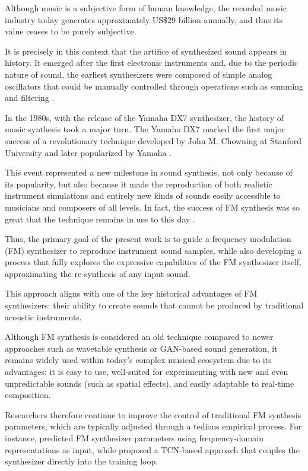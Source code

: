 \documentclass[10pt,conference]{IEEEtran}
\begin{document}
Although music is a subjective form of human knowledge, the recorded music industry today generates approximately US\$29 billion \cite{ifpi2025} annually, and thus its value ceases to be purely subjective.

It is precisely in this context that the artifice of synthesized sound appears in history. It emerged after the first electronic instruments and, due to the periodic nature of sound, the earliest synthesizers were composed of simple analog oscillators that could be manually controlled through operations such as summing and filtering \cite{holmes2016electronic}.

In the 1980s, with the release of the Yamaha DX7 synthesizer, the history of music synthesis took a major turn. The Yamaha DX7 marked the first major success of a revolutionary technique developed by John M. Chowning at Stanford University and later popularized by Yamaha \cite{claesson2021resynthesis}.

This event represented a new milestone in sound synthesis, not only because of its popularity, but also because it made the reproduction of both realistic instrument simulations and entirely new kinds of sounds easily accessible to musicians and composers of all levels. In fact, the success of FM synthesis was so great that the technique remains in use to this day \cite{holmes2016electronic}.

Thus, the primary goal of the present work is to guide a frequency modulation (FM) synthesizer to reproduce instrument sound samples, while also developing a process that fully explores the expressive capabilities of the FM synthesizer itself, approximating the re-synthesis of any input sound.

This approach aligns with one of the key historical advantages of FM synthesizers: their ability to create sounds that cannot be produced by traditional acoustic instruments.

Although FM synthesis is considered an old technique compared to newer approaches such as wavetable synthesis or GAN-based sound generation, it remains widely used within today’s complex musical ecosystem due to its advantages: it is easy to use, well-suited for experimenting with new and even unpredictable sounds (such as spatial effects), and easily adaptable to real-time composition.

Researchers therefore continue to improve the control of traditional FM synthesis parameters, which are typically adjusted through a tedious empirical process. For instance, \cite{claesson2021resynthesis} predicted FM synthesizer parameters using frequency-domain representations as input, while \cite{steinmetz2022ddx7} proposed a TCN-based approach that couples the synthesizer directly into the training loop.
\end{document}
